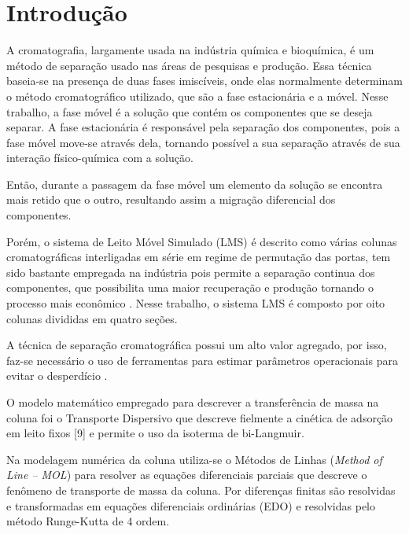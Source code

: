 \documentclass[por]{Template_SBEF}
\begin{document}
\maketitle
\thispagestyle{fancy}
\printcontactdata



\section{Introdução}

A cromatografia, largamente usada na indústria química e bioquímica, é um método de separação usado nas áreas de pesquisas e produção. Essa técnica baseia-se na presença de duas fases imiscíveis, onde elas normalmente determinam o método cromatográfico utilizado, que são a fase estacionária e a móvel. Nesse trabalho, a fase móvel é a solução que contém os componentes que se deseja separar. A fase estacionária é responsável pela separação dos componentes, pois a fase móvel move-se através dela, tornando possível a sua separação através de sua interação físico-química com a solução. 

Então, durante a passagem da fase móvel um elemento da solução se encontra mais retido que o outro, resultando assim a migração diferencial dos componentes.

Porém, o sistema de Leito Móvel Simulado (LMS) é descrito como várias colunas cromatográficas interligadas em série em regime de permutação das portas, tem sido bastante empregada na indústria pois permite a separação continua dos componentes, que possibilita uma maior recuperação e produção tornando o processo mais econômico \cite{cremasco}. Nesse trabalho, o sistema LMS é composto por oito colunas divididas em quatro seções.

A técnica de separação cromatográfica possui um alto valor agregado, por isso, faz-se necessário o uso de ferramentas para estimar parâmetros operacionais para evitar o desperdício \cite{bihain}.

O modelo matemático empregado para descrever a transferência de massa na coluna foi o Transporte Dispersivo que descreve fielmente a cinética de adsorção em leito fixos [9] e permite o uso da isoterma de bi-Langmuir.

Na modelagem numérica da coluna utiliza-se o Métodos de Linhas (\textit{Method of Line – MOL}) para resolver as equações diferenciais parciais que descreve o fenômeno de transporte de massa da coluna. Por diferenças finitas são resolvidas e transformadas em equações diferenciais ordinárias (EDO) e resolvidas pelo método Runge-Kutta de 4 ordem.
\end{document}
